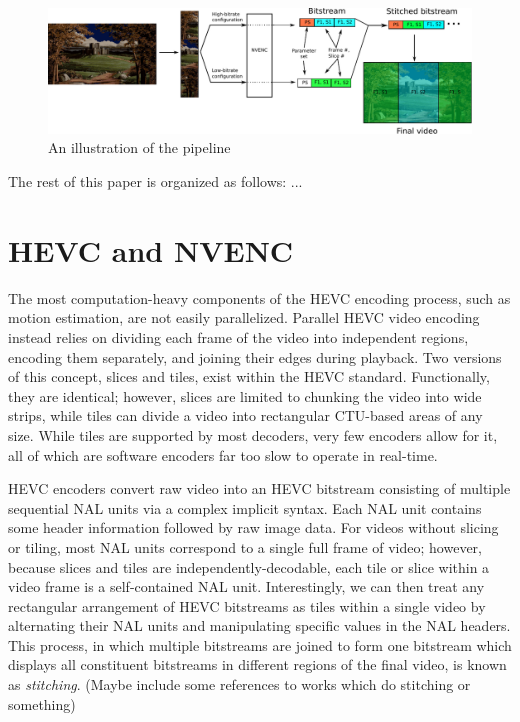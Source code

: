 \begin{figure}[t]
	\centering
	\includegraphics[width=\textwidth]{figures/pipeline.pdf}
	\caption{An illustration of the pipeline}
\end{figure}

The rest of this paper is organized as follows: ...

\section{HEVC and NVENC}

The most computation-heavy components of the HEVC encoding process, such as motion estimation, are not easily parallelized. Parallel HEVC video encoding instead relies on dividing each frame of the video into independent regions, encoding them separately, and joining their edges during playback. Two versions of this concept, slices and tiles, exist within the HEVC standard. Functionally, they are identical; however, slices are limited to chunking the video into wide strips, while tiles can divide a video into rectangular CTU-based areas of any size. While tiles are supported by most decoders, very few encoders allow for it, all of which are software encoders far too slow to operate in real-time. 

HEVC encoders convert raw video into an HEVC bitstream consisting of multiple sequential NAL units via a complex implicit syntax. Each NAL unit contains some header information followed by raw image data. For videos without slicing or tiling, most NAL units correspond to a single full frame of video; however, because slices and tiles are independently-decodable, each tile or slice within a video frame is a self-contained NAL unit. Interestingly, we can then treat any rectangular arrangement of HEVC bitstreams as tiles within a single video by alternating their NAL units and manipulating specific values in the NAL headers. This process, in which multiple bitstreams are joined to form one bitstream which displays all constituent bitstreams in different regions of the final video, is known as \textit{stitching}. (Maybe include some references to works which do stitching or something)

